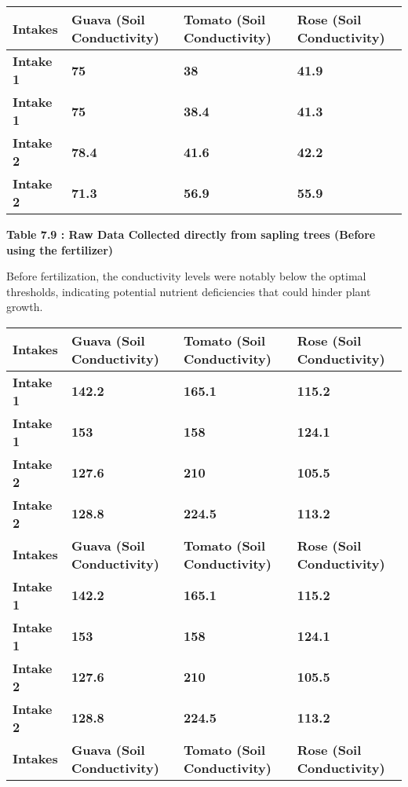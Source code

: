 \documentclass{book} %
\begin{document}
\begin{tabular}{|p{0.7in}|p{0.7in}|p{0.8in}|p{0.7in}|} \hline 
\textbf{Intakes} & \textbf{Guava (Soil Conductivity)} & \textbf{Tomato (Soil Conductivity)} & \textbf{Rose (Soil Conductivity)} \\ \hline 
\textbf{Intake 1} & \textbf{75} & \textbf{38} & \textbf{41.9} \\ \hline 
\textbf{Intake 1} & \textbf{75} & \textbf{38.4} & \textbf{41.3} \\ \hline 
\textbf{Intake 2} & \textbf{78.4} & \textbf{41.6} & \textbf{42.2} \\ \hline 
\textbf{Intake 2} & \textbf{71.3} & \textbf{56.9} & \textbf{55.9} \\ \hline 
\end{tabular}

\textbf{Table 7.9 : Raw Data Collected directly from sapling trees (Before using the fertilizer)}

\noindent Before fertilization, the conductivity levels were notably below the optimal thresholds, indicating potential nutrient deficiencies that could hinder plant growth. \textbf{}

\noindent \textbf{}

\begin{tabular}{|p{1.1in}|p{1.1in}|p{1.1in}|p{1.1in}|} \hline 
\textbf{Intakes} & \textbf{Guava (Soil Conductivity)} & \textbf{Tomato (Soil Conductivity)} & \textbf{Rose (Soil Conductivity)} \\ \hline 
\textbf{Intake 1} & \textbf{142.2} & \textbf{165.1} & \textbf{115.2} \\ \hline 
\textbf{Intake 1} & \textbf{153} & \textbf{158} & \textbf{124.1} \\ \hline 
\textbf{Intake 2} & \textbf{127.6} & \textbf{210} & \textbf{105.5} \\ \hline 
\textbf{Intake 2} & \textbf{128.8} & \textbf{224.5} & \textbf{113.2} \\ \hline 
\textbf{Intakes} & \textbf{Guava (Soil Conductivity)} & \textbf{Tomato (Soil Conductivity)} & \textbf{Rose (Soil Conductivity)} \\ \hline 
\textbf{Intake 1} & \textbf{142.2} & \textbf{165.1} & \textbf{115.2} \\ \hline 
\textbf{Intake 1} & \textbf{153} & \textbf{158} & \textbf{124.1} \\ \hline 
\textbf{Intake 2} & \textbf{127.6} & \textbf{210} & \textbf{105.5} \\ \hline 
\textbf{Intake 2} & \textbf{128.8} & \textbf{224.5} & \textbf{113.2} \\ \hline 
\textbf{Intakes} & \textbf{Guava (Soil Conductivity)} & \textbf{Tomato (Soil Conductivity)} & \textbf{Rose (Soil Conductivity)} \\ \hline 
\end{tabular}
\end{document}
